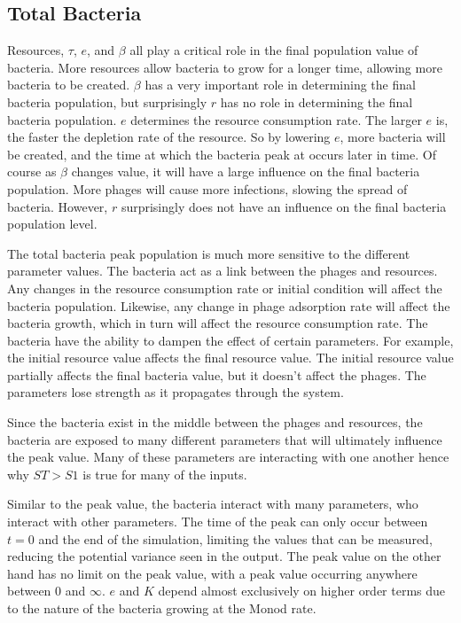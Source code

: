\subsection{Total Bacteria}
Resources, $\tau$, $e$, and $\beta$ all play a critical role in the final population value of bacteria. 
More resources allow bacteria to grow for a longer time, allowing more bacteria to be created. 
$\beta$ has a very important role in determining the final bacteria population, but surprisingly $r$ has no role in determining the final bacteria population. 
$e$ determines the resource consumption rate. 
The larger $e$ is, the faster the depletion rate of the resource. 
So by lowering $e$, more bacteria will be created, and the time at which the bacteria peak at occurs later in time. 
Of course as $\beta$ changes value, it will have a large influence on the final bacteria population. 
More phages will cause more infections, slowing the spread of bacteria. 
However, $r$ surprisingly does not have an influence on the final bacteria population level.  

The total bacteria peak population is much more sensitive to the different parameter values. 
The bacteria act as a link between the phages and resources. 
Any changes in the resource consumption rate or initial condition will affect the bacteria population. 
Likewise, any change in phage adsorption rate will affect the bacteria growth, which in turn will affect the resource consumption rate. 
The bacteria have the ability to dampen the effect of certain parameters. 
For example, the initial resource value affects the final resource value. 
The initial resource value partially affects the final bacteria value, but it doesn't affect the phages. 
The parameters lose strength as it propagates through the system. 

Since the bacteria exist in the middle between the phages and resources, the bacteria are exposed to many different parameters that will ultimately influence the peak value. 
Many of these parameters are interacting with one another hence why $ST > S1$ is true for many of the inputs. 

Similar to the peak value, the bacteria interact with many parameters, who interact with other parameters. 
The time of the peak can only occur between $t=0$ and the end of the simulation, limiting the values that can be measured, reducing the potential variance seen in the output. 
The peak value on the other hand has no limit on the peak value, with a peak value occurring anywhere between 0 and $\infty$. 
$e$ and $K$ depend almost exclusively on higher order terms due to the nature of the bacteria growing at the Monod rate. 

